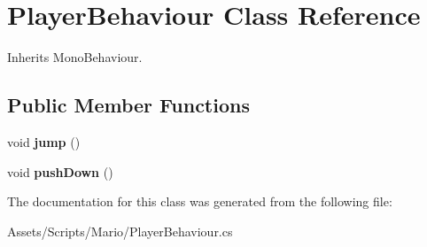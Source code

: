 \hypertarget{class_player_behaviour}{\section{Player\-Behaviour Class Reference}
\label{class_player_behaviour}
}


Inherits Mono\-Behaviour.

\subsection*{Public Member Functions}
\begin{DoxyCompactItemize}
\item 
\hypertarget{class_player_behaviour_a90efe6dc33f0c6f614eb1d6990756a79}{void {\bfseries jump} ()}\label{class_player_behaviour_a90efe6dc33f0c6f614eb1d6990756a79}

\item 
\hypertarget{class_player_behaviour_a9b3931522f125dfab75679469e5668c3}{void {\bfseries push\-Down} ()}\label{class_player_behaviour_a9b3931522f125dfab75679469e5668c3}

\end{DoxyCompactItemize}


The documentation for this class was generated from the following file\-:\begin{DoxyCompactItemize}
\item 
Assets/\-Scripts/\-Mario/Player\-Behaviour.\-cs\end{DoxyCompactItemize}
